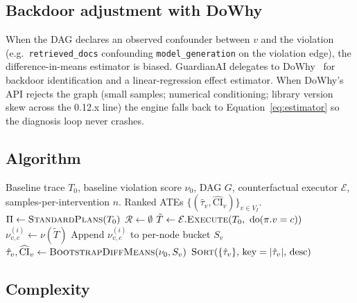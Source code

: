 \documentclass[11pt,letterpaper]{article}
\begin{document}
\subsection{Backdoor adjustment with DoWhy}
\label{sec:dowhy}

When the DAG declares an observed confounder between $v$ and the
violation (e.g.\ \texttt{retrieved\_docs} confounding
\texttt{model\_generation} on the violation edge), the
difference-in-means estimator is biased.  GuardianAI delegates to
DoWhy~\cite{sharma2020dowhy} for backdoor identification and a
linear-regression effect estimator.  When DoWhy's API rejects the
graph (small samples; numerical conditioning; library version
skew across the 0.12.x line) the engine falls back to
Equation~\eqref{eq:estimator} so the diagnosis loop never crashes.

\subsection{Algorithm}
\label{sec:algorithm}

\begin{algorithm}[t]
\caption{Counterfactual Causal Diagnosis}
\label{alg:diagnose}
\begin{algorithmic}[1]
\Require Baseline trace $T_0$, baseline violation score $\nu_0$, DAG $G$,
         counterfactual executor $\mathcal{E}$, samples-per-intervention $n$.
\Ensure  Ranked ATEs $\{(\hat{\tau}_v, \widehat{\mathrm{CI}}_v)\}_{v \in V_I}$.
\State $\Pi \gets \textsc{StandardPlans}(T_0)$
\State $\mathcal{R} \gets \emptyset$
    \State $\tilde{T} \gets \mathcal{E}.\textsc{Execute}(T_0,\ \mathrm{do}(\pi.v = c))$
    \State $\nu_{v,c}^{(i)} \gets \nu(\tilde{T})$
    \State Append $\nu_{v,c}^{(i)}$ to per-node bucket $S_v$
  \EndFor
\EndFor
{}
  \State $\hat{\tau}_v, \widehat{\mathrm{CI}}_v \gets \textsc{BootstrapDiffMeans}(\nu_0, S_v)$
\EndFor
\State \Return $\textsc{Sort}(\{\hat{\tau}_v\}, \,\text{key}=|\hat{\tau}_v|, \,\text{desc})$
\end{algorithmic}
\end{algorithm}

\subsection{Complexity}
\label{sec:complexity}
\end{document}
